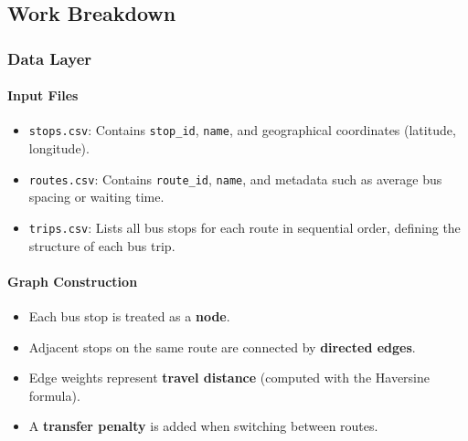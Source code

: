 \subsection{Work Breakdown}

\subsubsection{Data Layer}
\paragraph{Input Files}
\begin{itemize}
  \item \texttt{stops.csv}: Contains \texttt{stop\_id}, \texttt{name}, and geographical coordinates (latitude, longitude).
  \item \texttt{routes.csv}: Contains \texttt{route\_id}, \texttt{name}, and metadata such as average bus spacing or waiting time.
  \item \texttt{trips.csv}: Lists all bus stops for each route in sequential order, defining the structure of each bus trip.
\end{itemize}

\paragraph{Graph Construction}
\begin{itemize}
  \item Each bus stop is treated as a \textbf{node}.
  \item Adjacent stops on the same route are connected by \textbf{directed edges}.
  \item Edge weights represent \textbf{travel distance} (computed with the Haversine formula).
  \item A \textbf{transfer penalty} is added when switching between routes.
\end{itemize}

